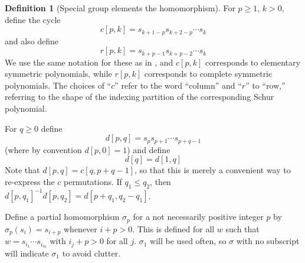 \documentclass{amsart}
\theoremstyle{definition}
\newtheorem{definition}[lemma]{Definition}
\theoremstyle{remark}
\numberwithin{equation}{subsection}
\begin{document}
\begin{definition}[Special group elements the homomorphism] \label{definition:specelem}
	For $p\geq 1$, $k>0$, define the cycle 
	$$c[p,k]=s_{k+1-p}s_{k+2-p}\cdots s_k$$
	and also define
	$$r[p,k]=s_{k+p-1}s_{k+p-2}\cdots s_k$$
	We use the same notation for these as in \cite{sottile}, and $c[p,k]$ corresponds to elementary symmetric polynomials, while $r[p,k]$ corresponds to complete symmetric polynomials. The choices of ``$c$'' refer to the word ``column'' and ``$r$'' to ``row,'' referring to the shape of the indexing partition of the corresponding Schur polynomial.
	
	For $q\geq 0$ define
	$$d[p,q]=s_ps_{p+1}\cdots s_{p+q-1}$$
	(where by convention $d[p,0]=1$) and define 
	$$d[q]=d[1,q]$$
	Note that $d[p,q]=c[q,p+q-1]$, so that this is merely a convenient way to re-express the $c$ permutations. If $q_1\leq q_2$, then $d[p,q_1]^{-1}d[p,q_2]=d[p+q_1,q_2-q_1]$.
	
		
		Define a partial homomorphism $\sigma_p$ for a not necessarily positive integer $p$ by $\sigma_p(s_i)=s_{i+p}$ whenever $i+p>0$. This is defined for all $w$ such that $w=s_{i_1}\cdots s_{i_m}$ with $i_j+p>0$ for all $j$. $\sigma_1$ will be used often, so $\sigma$ with no subscript will indicate $\sigma_1$ to avoid clutter.
	\end{definition}
	
\end{document}
